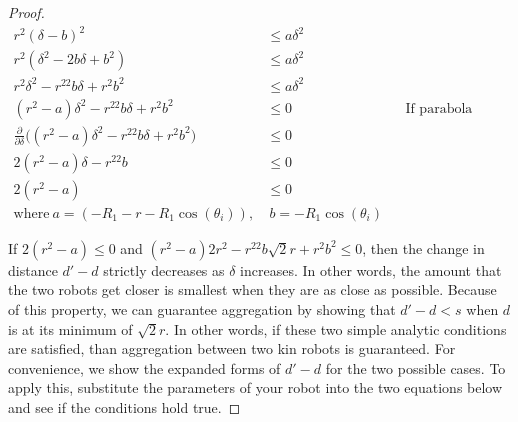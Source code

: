 \documentclass[conference]{IEEEtran}
\begin{document}
\begin{proof}
\begin{align*}
      r^2(\delta-b)^2 &\leq a\delta^2 \\
      r^2(\delta^2-2b\delta+b^2) &\leq a\delta^2 \\
      r^2\delta^2 - r^22b\delta + r^2b^2 &\leq a\delta^2 \\
      (r^2 - a)\delta^2 - r^22b\delta + r^2b^2 &\leq 0 && \text{If parabola opens down} \\
      \frac{\partial}{\partial\delta}\big((r^2 - a)\delta^2 - r^22b\delta + r^2b^2\big) &\leq 0 \\
      2(r^2 - a)\delta - r^22b &\leq 0 \\
      2(r^2 - a) &\leq 0 \\
      \text{where}\  a=(-R_1-r-R_1\cos(\theta_i)),&\  b=-R_1\cos(\theta_i)
    \end{align*}

    If $2(r^2 - a) \leq 0$ and $(r^2 - a)2r^2 - r^22b\sqrt{2}r + r^2b^2 \leq 0$, then the change in distance $d'-d$ strictly decreases as $\delta$ increases. In other words, the amount that the two robots get closer is smallest when they are as close as possible. Because of this property, we can guarantee aggregation by showing that $d'-d<s$ when $d$ is at its minimum of $\sqrt{2}r$. In other words, if these two simple analytic conditions are satisfied, than aggregation between two kin robots is guaranteed. For convenience, we show the expanded forms of $d'-d$ for the two possible cases. To apply this, substitute the parameters of your robot into the two equations below and see if the conditions hold true.

  \end{proof}
\end{document}
